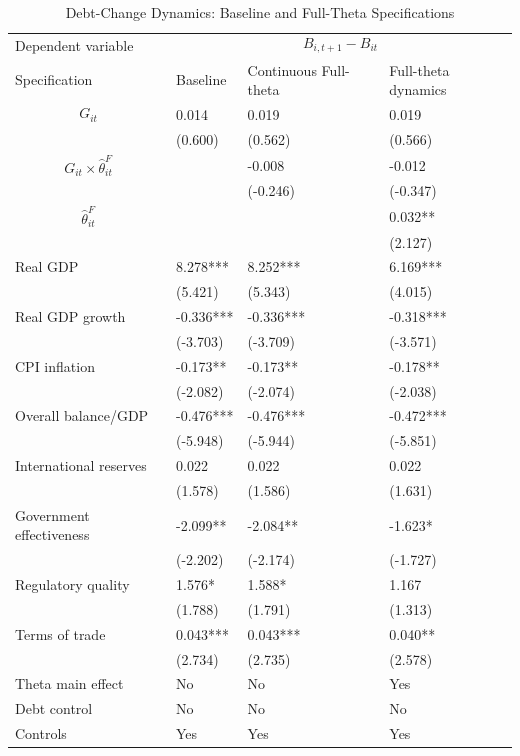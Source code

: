 \begin{table}[H]\centering
\begin{threeparttable}
\caption{Debt-Change Dynamics: Baseline and Full-Theta Specifications}
\label{tab:debt_change_combined_fulltheta}
\scriptsize
\begin{tabularx}{\textwidth}{lYYY}
\toprule
Dependent variable &  \\
\cmidrule(lr){2-4}
Specification & Baseline & Continuous Full-theta & Full-theta dynamics \\
\midrule
$$G_{it}$$ & 0.014 & 0.019 & 0.019 \\
 & (0.600) & (0.562) & (0.566) \\
$$G_{it}\times\widehat{\theta}^{F}_{it}$$ &  & -0.008 & -0.012 \\
 &  & (-0.246) & (-0.347) \\
$$\widehat{\theta}^{F}_{it}$$ &  &  & 0.032** \\
 &  &  & (2.127) \\
Real GDP & 8.278*** & 8.252*** & 6.169*** \\
 & (5.421) & (5.343) & (4.015) \\
Real GDP growth & -0.336*** & -0.336*** & -0.318*** \\
 & (-3.703) & (-3.709) & (-3.571) \\
CPI inflation & -0.173** & -0.173** & -0.178** \\
 & (-2.082) & (-2.074) & (-2.038) \\
Overall balance/GDP & -0.476*** & -0.476*** & -0.472*** \\
 & (-5.948) & (-5.944) & (-5.851) \\
International reserves & 0.022 & 0.022 & 0.022 \\
 & (1.578) & (1.586) & (1.631) \\
Government effectiveness & -2.099** & -2.084** & -1.623* \\
 & (-2.202) & (-2.174) & (-1.727) \\
Regulatory quality & 1.576* & 1.588* & 1.167 \\
 & (1.788) & (1.791) & (1.313) \\
Terms of trade & 0.043*** & 0.043*** & 0.040** \\
 & (2.734) & (2.735) & (2.578) \\
\midrule
Theta main effect & No & No & Yes \\
Debt control & No & No & No \\
Controls & Yes & Yes & Yes \\

\end{tabularx}
\end{threeparttable}
\end{table}
